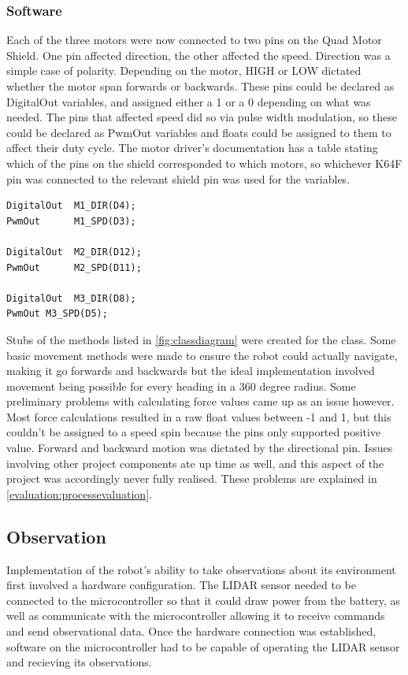 				\subsubsection{Software}
				\label{req:movement:software}
				Each of the three motors were now connected to two pins on the Quad Motor Shield. One pin affected direction, the other affected the speed. Direction was a simple case of polarity. Depending on the motor, HIGH or LOW dictated whether the motor span forwards or backwards. These pins could be declared as DigitalOut variables, and assigned either a 1 or a 0 depending on what was needed.  The pins that affected speed did so via pulse width modulation, so these could be declared as PwmOut variables and floats could be assigned to them to affect their duty cycle. The motor driver's documentation has a table stating which of the pins on the shield corresponded to which motors, so whichever K64F pin was connected to the relevant shield pin was used for the variables.
				\begin{lstlisting}
DigitalOut  M1_DIR(D4);
PwmOut      M1_SPD(D3);
			
DigitalOut  M2_DIR(D12);
PwmOut      M2_SPD(D11);
				
DigitalOut  M3_DIR(D8);
PwmOut M3_SPD(D5);
				\end{lstlisting}
				
				Stubs of the methods listed in \ref{fig:classdiagram} were created for the class. Some basic movement methods were made to ensure the robot could actually navigate, making it go forwards and backwards but the ideal implementation involved movement being possible for every heading in a 360 degree radius. Some preliminary problems with calculating force values came up as an issue however. Most force calculations resulted in a raw float values between -1 and 1, but this couldn't be assigned to a speed spin because the pins only supported positive value. Forward and backward motion was dictated by the directional pin. Issues involving other project components ate up time as well, and this aspect of the project was accordingly never fully realised. These problems are explained in \ref{evaluation:processevaluation}.
				
			\subsection{Observation}
			Implementation of the robot's ability to take observations about its environment first involved a hardware configuration. The LIDAR sensor needed to be connected to the microcontroller so that it could draw power from the battery, as well as communicate with the microcontroller allowing it to receive commands and send observational data. Once the hardware connection was established, software on the microcontroller had to be capable of operating the LIDAR sensor and recieving its observations.
